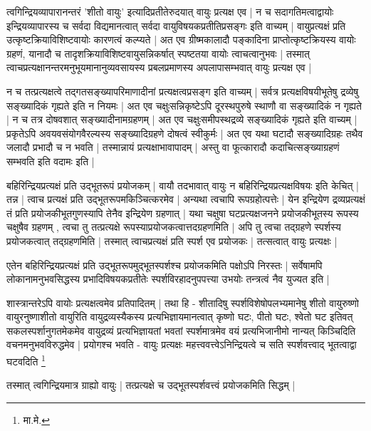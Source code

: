 त्वगिन्द्रियव्यापारानन्तरं 'शीतो वायुः' इत्यादिप्रतीतेरुदयात् वायुः प्रत्यक्ष एव | न च सदागतिमत्वाद्वायोः इन्द्रियव्यापारस्य च सर्वदा विद्यमानत्वात् सर्वदा वायुविषयकप्रतीतिप्रसङ्गः इति वाच्यम् | वायुप्रत्यक्षं प्रति उत्कृष्टक्रियाविशिष्टवायोः कारणत्वं कल्प्यते | अत एव ग्रीष्मकालादौ पङ्कादिना प्राप्तोत्कृष्टक्रियस्य वायोः ग्रहणं, यानादौ च तादृशक्रियाविशिष्टवायुसन्निकर्षात् स्पष्टतया वायोः त्वाचत्वानुभवः | तस्मात् त्वाचप्रत्यक्षानन्तरमनुभूयमानानुव्यवसायस्य प्रबलप्रमाणस्य अपलापासम्भवात् वायुः प्रत्यक्ष एव |

न च तत्प्रत्यक्षत्वे तद्गतसङ्ख्यापरिमाणादीनां प्रत्यक्षत्वप्रसङ्ग इति वाच्यम् | सर्वत्र प्रत्यक्षविषयीभूतेषु द्रव्येषु सङ्ख्यादिकं गृह्यते इति न नियमः | अत एव चक्षुःसन्निकृष्टेऽपि दूरस्थपुरुषे स्थाणौ वा सङ्ख्यादिकं न गृह्यते | न च तत्र दोषवशात् सङ्ख्यादीनामग्रहणम् | अत एव चक्षुःसमीपस्थद्रव्ये सङ्ख्यादिकं गृह्यते इति वाच्यम् | प्रकृतेऽपि अवयवसंयोगवैरल्यस्य सङ्ख्यादिग्रहणे दोषत्वं स्वीकुर्मः‌ | अत एव यथा घटादौ सङ्ख्यादिग्रहः तथैव जलादौ प्रभादौ च न भवति | तस्मान्नायं प्रत्यक्षाभावापादम् | अस्तु वा फूत्कारादौ कदाचित्सङ्ख्याग्रहणं सम्भवति इति वदामः इति |

बहिरिन्द्रियप्रत्यक्षं प्रति उद्भूतरूपं प्रयोजकम् | वायौ तदभावात् वायुः‌ न बहिरिन्द्रियप्रत्यक्षविषयः‌ इति केचित् | तन्न | त्वाच प्रत्यक्षं प्रति उद्भूतरूपमकिञ्चित्करमेव | अन्यथा त्वचापि रूपग्रहोत्पत्तेः | येन इन्द्रियेण द्रव्यप्रत्यक्षं तं प्रति प्रयोजकीभूतगुणस्यापि तेनैव इन्द्रियेण ग्रहणात् | यथा चक्षुषा घटप्रत्यक्षजनने प्रयोजकीभूतस्य रूपस्य चक्षुषैव ग्रहणम् , त्वचा तु तत्प्रत्यक्षे रूपस्याप्रयोजकत्वात्तदग्रहणमिति | अपि तु त्वचा तद्ग्रहणे स्पर्शस्य प्रयोजकत्वात् तद्ग्रहणमिति | तस्मात् त्वाचप्रत्यक्षं प्रति स्पर्श एव प्रयोजकः | तत्सत्वात् वायुः प्रत्यक्षः‌ |

एतेन बहिरिन्द्रियप्रत्यक्षं प्रति उद्भूतरूपमुद्भूतस्पर्शश्च प्रयोजकमिति पक्षोऽपि निरस्तः | सर्वेषामपि लोकानामनुभवसिद्धस्य प्रभादिविषयकप्रतीतेः स्पर्शविरहादनुपपत्त्या उभयोः तन्त्रत्वं नैव युज्यत इति |

शास्त्रान्तरेऽपि वायोः प्रत्यक्षत्वमेव प्रतिपादितम् | तथा हि - {\fontsize{11.7}{0}\selectfont\s शीतादिषु स्पर्शविशेषोपलभ्यमानेषु शीतो वायुरुष्णो वायुरनुष्णाशीतो वायुरिति वायुद्रव्यस्यैकस्य प्रत्यभिज्ञायमानत्वात् कृष्णो घटः, पीतो घटः, श्वेतो घट इतिवत् सकलस्पर्शानुगतमेकमेव वायुद्रव्यं प्रत्यभिज्ञायतां भवतां स्पर्शमात्रमेव वयं प्रत्यभिजानीमो नान्यत् किञ्चिदिति वचनमनुभवविरुद्धमेव | प्रयोगश्च भवति - वायुः प्रत्यक्षः महत्त्ववत्त्वेऽनिन्द्रियत्वे च सति स्पर्शवत्त्वाद् भूतत्वाद्वा घटवदिति \footnote{मा.मे.}}

तस्मात् त्वगिन्द्रियमात्र ग्राह्यो वायुः | तत्प्रत्यक्षे च उद्भूतस्पर्शवत्त्वं प्रयोजकमिति सिद्धम् |
